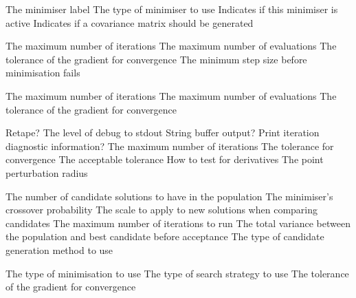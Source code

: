 \par\par
{} {The minimiser label}
 {The type of minimiser to use}
 {Indicates if this minimiser is active}
 {Indicates if a covariance matrix should be generated}
\par\textbf{}\par
{} {The maximum number of iterations}
 {The maximum number of evaluations}
 {The tolerance of the gradient for convergence}
 {The minimum step size before minimisation fails}
\par\textbf{}\par
{} {The maximum number of iterations}
 {The maximum number of evaluations}
 {The tolerance of the gradient for convergence}
\par\textbf{}\par
{} {Retape?}
 {The level of debug to stdout}
 {String buffer output?}
 {Print iteration diagnostic information?}
 {The maximum number of iterations}
 {The tolerance for convergence}
 {The acceptable tolerance}
 {}
 {How to test for derivatives}
 {The point perturbation radius}
\par\textbf{}\par
{} {The number of candidate solutions to have in the population}
 {The minimiser's crossover probability}
 {The scale to apply to new solutions when comparing candidates}
 {The maximum number of iterations to run}
 {The total variance between the population and best candidate before acceptance}
 {The type of candidate generation method to use}
\par\textbf{}\par
{} {The type of minimisation to use}
 {The type of search strategy to use}
 {The tolerance of the gradient for convergence}
